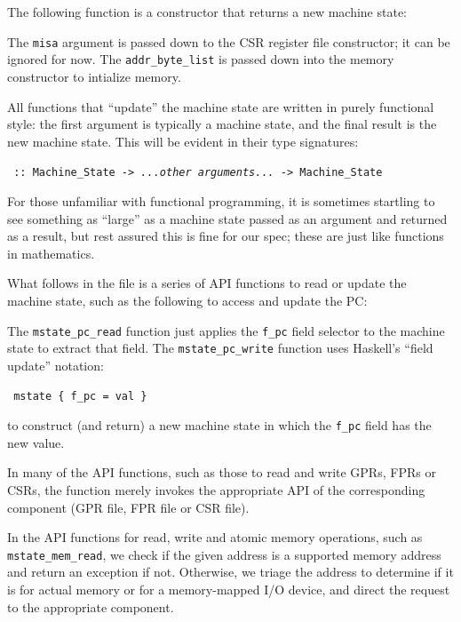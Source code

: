 \documentclass[11pt]{article}
\newcommand{\hmm}{\hspace*{2em}}
\begin{document}
The following function is a constructor that returns a new machine state:



The \verb|misa| argument is passed down to the CSR register file
constructor; it can be ignored for now.  The \verb|addr_byte_list| is
passed down into the memory constructor to intialize memory.

All functions that ``update'' the machine state are written in purely
functional style: the first argument is typically a machine state, and
the final result is the new machine state.  This will be evident in
their type signatures:

\begin{tabbing}\tt
\hmm {\it somefunction} :: Machine\_State -> {\it ...other arguments...} -> Machine\_State
\end{tabbing}

For those unfamiliar with functional programming, it is sometimes
startling to see something as ``large'' as a machine state passed as
an argument and returned as a result, but rest assured this is fine
for our spec; these are just like functions in mathematics.

What follows in the file is a series of API functions to read or
update the machine state, such as the following to access and update
the PC:



The \verb|mstate_pc_read| function just applies the \verb|f_pc| field
selector to the machine state to extract that field.  The
\verb|mstate_pc_write| function uses Haskell's ``field update''
notation:

\begin{tabbing}\tt
\hmm \verb|mstate { f_pc = val }|
\end{tabbing}
to construct (and return) a new machine state in which the \verb|f_pc|
field has the new value.

In many of the API functions, such as those to read and write GPRs,
FPRs or CSRs, the function merely invokes the appropriate API of the
corresponding component (GPR file, FPR file or CSR file).

In the API functions for read, write and atomic memory operations,
such as \verb|mstate_mem_read|, we check if the given address is a
supported memory address and return an exception if not.  Otherwise,
we triage the address to determine if it is for actual memory or for a
memory-mapped I/O device, and direct the request to the appropriate
component.
\end{document}
